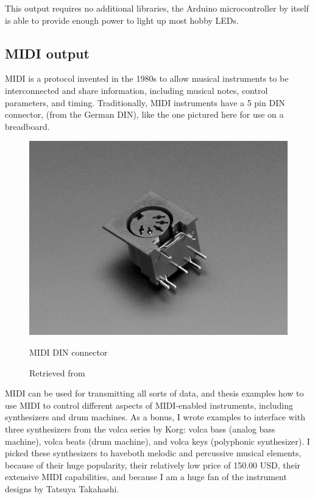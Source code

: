 This output requires no additional libraries, the Arduino microcontroller by itself is able to provide enough power to light up most hobby LEDs.

\subsection{MIDI output}

\acrfull{MIDI} is a protocol invented in the 1980s to allow musical instruments to be interconnected and share information, including musical notes, control parameters, and timing. Traditionally, MIDI instruments have a 5 pin  \acrshort{DIN} connector, (from the German \acrlong{DIN}), like the one pictured here for use on a breadboard.

\begin{figure}[ht]
  \centering
  \includegraphics[width=0.75\linewidth,height=0.25\textheight,keepaspectratio]{images/materials-adafruit-midi-jack.jpg}
  \caption{MIDI DIN connector}
  \caption*{Retrieved from \cite{website-materials-adafruit-midi-jack}}
  \label{fig:materials-adafruit-midi-jack}
\end{figure}

MIDI can be used for transmitting all sorts of data, and thesis examples how to use MIDI to control different aspects of MIDI-enabled instruments, including synthesizers and drum machines. As a bonus, I wrote examples to interface with three synthesizers from the volca series by Korg: volca bass (analog bass machine), volca beats (drum machine), and volca keys (polyphonic synthesizer). I picked these synthesizers to haveboth melodic and percussive musical elements, because of their huge popularity, their relatively low price of 150.00 USD, their extensive MIDI capabilities, and because I am a huge fan of the instrument designs by Tatsuya Takahashi.

